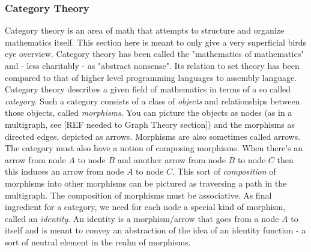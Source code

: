 \subsubsection{Category Theory}
Category theory is an area of math that attempts to structure and organize mathematics itself. This section here is meant to only give a very superficial birds eye overview. Category theory has been called the "mathematics of mathematics" and - less charitably - as "abstract nonsense". Its relation to set theory has been compared to that of higher level programming languages to assembly language. Category theory describes a given field of mathematics in terms of a so called \emph{category}. Such a category consists of a class of \emph{objects} and relationships between those objects, called \emph{morphisms}. You can picture the objects as nodes (as in a multigraph, see [REF needed to Graph Theory section]) and the morphisms as directed edges, depicted as arrows. Morphisms are also sometimes called arrows. The category must also have a notion of composing morphisms. When there's an arrow from node $A$ to node $B$ and another arrow from node $B$ to node $C$ then this induces an arrow from node $A$ to node $C$. This sort of \emph{composition} of morphisms into other morphisms can be pictured as traversing a path in the multigraph. The composition of morphisms must be associative. As final ingredient for a category, we need for each node a special kind of morphism, called an \emph{identity}. An identity is a morphism/arrow that goes from a node $A$ to itself and is meant to convey an abstraction of the idea of an identity function - a sort of neutral element in the realm of morphisms.


